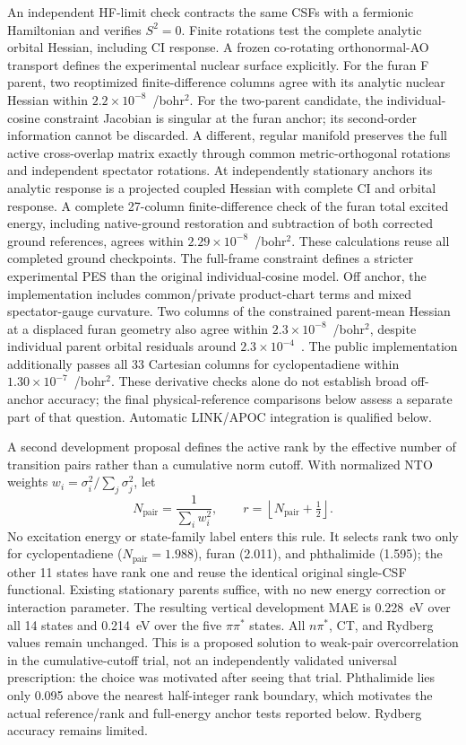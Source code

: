 An independent HF-limit check contracts the same CSFs with a fermionic Hamiltonian and verifies $S^2=0$. Finite rotations test the complete analytic orbital Hessian, including CI response. A frozen co-rotating orthonormal-AO transport defines the experimental nuclear surface explicitly. For the furan F parent, two reoptimized finite-difference columns agree with its analytic nuclear Hessian within $2.2\times10^{-8}$~\Eh/bohr$^2$. For the two-parent candidate, the individual-cosine constraint Jacobian is singular at the furan anchor; its second-order information cannot be discarded. A different, regular manifold preserves the full active cross-overlap matrix exactly through common metric-orthogonal rotations and independent spectator rotations. At independently stationary anchors its analytic response is a projected coupled Hessian with complete CI and orbital response. A complete 27-column finite-difference check of the furan total excited energy, including native-ground restoration and subtraction of both corrected ground references, agrees within $2.29\times10^{-8}$~\Eh/bohr$^2$. These calculations reuse all completed ground checkpoints. The full-frame constraint defines a stricter experimental PES than the original individual-cosine model. Off anchor, the implementation includes common/private product-chart terms and mixed spectator-gauge curvature. Two columns of the constrained parent-mean Hessian at a displaced furan geometry also agree within $2.3\times10^{-8}$~\Eh/bohr$^2$, despite individual parent orbital residuals around $2.3\times10^{-4}$~\Eh. The public implementation additionally passes all 33 Cartesian columns for cyclopentadiene within $1.30\times10^{-7}$~\Eh/bohr$^2$. These derivative checks alone do not establish broad off-anchor accuracy; the final physical-reference comparisons below assess a separate part of that question. Automatic LINK/APOC integration is qualified below.

A second development proposal defines the active rank by the effective number of transition pairs rather than a cumulative norm cutoff. With normalized NTO weights $w_i=\sigma_i^2/\sum_j\sigma_j^2$, let
\begin{equation}
 N_{\mathrm{pair}}=\frac{1}{\sum_i w_i^2},\qquad
 r=\left\lfloor N_{\mathrm{pair}}+\tfrac12\right\rfloor.
\end{equation}
No excitation energy or state-family label enters this rule. It selects rank two only for cyclopentadiene ($N_{\mathrm{pair}}=1.988$), furan (2.011), and phthalimide (1.595); the other 11 states have rank one and reuse the identical original single-CSF functional. Existing stationary parents suffice, with no new energy correction or interaction parameter. The resulting vertical development MAE is 0.228~eV over all 14 states and 0.214~eV over the five $\pi\pi^*$ states. All $n\pi^*$, CT, and Rydberg values remain unchanged. This is a proposed solution to weak-pair overcorrelation in the cumulative-cutoff trial, not an independently validated universal prescription: the choice was motivated after seeing that trial. Phthalimide lies only 0.095 above the nearest half-integer rank boundary, which motivates the actual reference/rank and full-energy anchor tests reported below. Rydberg accuracy remains limited.

